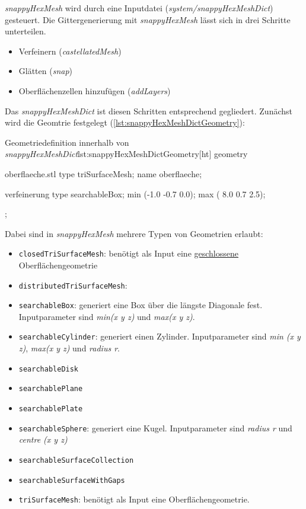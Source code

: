 \textit{snappyHexMesh} wird durch eine Inputdatei (\textit{system/snappyHexMeshDict}) gesteuert. Die Gittergenerierung mit \textit{snappyHexMesh} lässt sich in drei Schritte unterteilen.
\begin{itemize}
	\item Verfeinern	(\textit{castellatedMesh})
	\item Glätten		(\textit{snap})
	\item Oberflächenzellen hinzufügen	(\textit{addLayers})
\end{itemize}
Das \textit{snappyHexMeshDict} ist diesen Schritten entsprechend gegliedert. Zunächst wird die Geomtrie festgelegt (\autoref{lst:snappyHexMeshDictGeometry}):

\begin{dict}{Geometriedefinition innerhalb von \textit{snappyHexMeshDict}}{lst:snappyHexMeshDictGeometry}[ht]
geometry
{
    oberflaeche.stl
    {
        type triSurfaceMesh;
        name oberflaeche;
    }

    verfeinerung
    {
        type searchableBox;
        min (-1.0 -0.7 0.0);
        max ( 8.0  0.7 2.5);
    }
};
\end{dict}

Dabei sind in \textit{snappyHexMesh} mehrere Typen von Geometrien erlaubt:
\begin{itemize}

	\item \texttt{closedTriSurfaceMesh}: benötigt als Input eine \underline{geschlossene} Oberflächengeometrie
	\item \texttt{distributedTriSurfaceMesh}: 
	\item \texttt{searchableBox}: generiert eine Box über die längste Diagonale fest. Inputparameter sind \textit{min(x y z)} und \textit{max(x y z)}.
	\item \texttt{searchableCylinder}: generiert einen Zylinder. Inputparameter sind \textit{min (x y z)}, \textit{max(x y z)} und \textit{radius r}.
	\item \texttt{searchableDisk} 
	\item \texttt{searchablePlane} 
	\item \texttt{searchablePlate} 
	\item \texttt{searchableSphere}: generiert eine Kugel. Inputparameter sind \textit{radius r} und \textit{centre (x y z)}
	\item \texttt{searchableSurfaceCollection} 
	\item \texttt{searchableSurfaceWithGaps} 
	\item \texttt{triSurfaceMesh}: benötigt als Input eine Oberflächengeometrie. 
	
\end{itemize}

